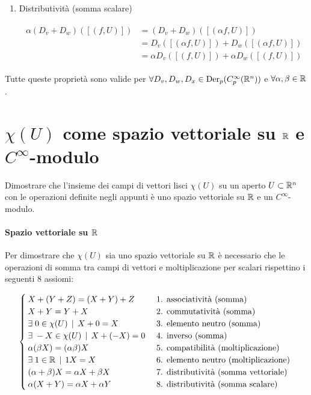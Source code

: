 \begin{enumerate}
	\item Distributività (somma scalare)
	
	\begin{align}
		\begin{split}
			\alpha (D_{v} + D_{w}) ([(f,U)]) &= (D_{v} + D_{w}) ([(\alpha f,U)])\\
			&= D_{v} ([(\alpha f,U)]) + D_{w} ([(\alpha f,U)])\\
			&= \alpha D_{v} ([(f,U)]) + \alpha D_{w} ([(f,U)])
		\end{split}
	\end{align}
\end{enumerate}

Tutte queste proprietà sono valide per $ \forall D_{v}, D_{w}, D_{x} \in \operatorname{Der}_{p}(C_{p}^{\infty}(\mathbb{R}^{n})) $ e $ \forall \alpha, \beta \in \mathbb{R} $.

%

\newpage

%

\section{$ \chi(U) $ come spazio vettoriale su $ \mathbb{R} $ e $ C^{\infty} $-modulo}\label{es1-9}

\begin{tcolorbox}
	Dimostrare che l'insieme dei campi di vettori lisci $ \chi(U) $ su un aperto $ U \subset \mathbb{R}^{n} $ con le operazioni definite negli appunti è uno spazio vettoriale su $ \mathbb{R} $ e un $ C^{\infty} $-modulo.
\end{tcolorbox}

\paragraph{Spazio vettoriale su $ \mathbb{R} $}

Per dimostrare che $ \chi(U) $ sia uno spazio vettoriale su $ \mathbb{R} $ è necessario che le operazioni di somma tra campi di vettori e moltiplicazione per scalari rispettino i seguenti 8 assiomi:

\begin{equation}
	\begin{cases}
		X + (Y + Z) = (X + Y) + Z & \text{ 1. associatività (somma) }\\
		X + Y = Y + X & \text{ 2. commutatività (somma) }\\
		\exists \; 0 \in \chi(U) \, \mid \, X + 0 = X & \text{ 3. elemento neutro (somma) }\\
		\exists \; - X \in \chi(U) \, \mid \, X + (- X) = 0 & \text{ 4. inverso (somma) }\\
		\alpha (\beta X) = (\alpha \beta) X & \text{ 5. compatibilità (moltiplicazione) }\\
		\exists \; 1 \in \mathbb{R} \, \mid \, 1 X = X & \text{ 6. elemento neutro (moltiplicazione) }\\
		(\alpha + \beta) X = \alpha X + \beta X & \text{ 7. distributività (somma vettoriale) }\\
		\alpha (X + Y) = \alpha X + \alpha Y & \text{ 8. distributività (somma scalare) }
	\end{cases}
\end{equation}

